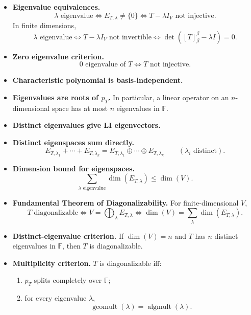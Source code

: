 \begin{itemize}[leftmargin=*]
\item \textbf{Eigenvalue equivalences.}
\[
\lambda\text{ eigenvalue}
\iff E_{T,\lambda}\neq\{0\}
\iff T-\lambda I_V\text{ not injective}.
\]
In finite dimensions,
\[
\lambda\text{ eigenvalue}
\iff T-\lambda I_V\text{ not invertible}
\iff \det([T]^{\beta}_{\beta}-\lambda I)=0.
\]

\item \textbf{Zero eigenvalue criterion.}
\[
0\text{ eigenvalue of }T \iff T\text{ not injective}.
\]

\item \textbf{Characteristic polynomial is basis-independent.}

\item \textbf{Eigenvalues are roots of $p_T$.} In particular, a linear operator on an $n$-dimensional space has at most $n$ eigenvalues in $\mathbb F$.

\item \textbf{Distinct eigenvalues give LI eigenvectors.}

\item \textbf{Distinct eigenspaces sum directly.}
\[
E_{T,\lambda_1}+\cdots+E_{T,\lambda_k}
=
E_{T,\lambda_1}\oplus\cdots\oplus E_{T,\lambda_k}
\qquad(\lambda_i\text{ distinct}).
\]

\item \textbf{Dimension bound for eigenspaces.}
\[
\sum_{\lambda\text{ eigenvalue}}\dim(E_{T,\lambda})\le \dim(V).
\]

\item \textbf{Fundamental Theorem of Diagonalizability.} For finite-dimensional $V$,
\[
T\text{ diagonalizable}
\iff
V=\bigoplus_{\lambda}E_{T,\lambda}
\iff
\dim(V)=\sum_{\lambda}\dim(E_{T,\lambda}).
\]

\item \textbf{Distinct-eigenvalue criterion.} If $\dim(V)=n$ and $T$ has $n$ distinct eigenvalues in $\mathbb F$, then $T$ is diagonalizable.

\item \textbf{Multiplicity criterion.} $T$ is diagonalizable iff:
\begin{enumerate}[leftmargin=*]
\item $p_T$ splits completely over $\mathbb F$;
\item for every eigenvalue $\lambda$,
\[
\operatorname{geomult}(\lambda)=\operatorname{algmult}(\lambda).
\]
\end{enumerate}
\end{itemize}

